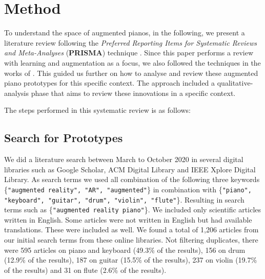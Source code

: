 \documentclass[sigchi, review]{acmart}
\begin{document}

\section{Method}
To understand the space of augmented pianos, in the following, we present a literature review following the \textit{Preferred Reporting Items for Systematic Reviews and Meta-Analyses} (\textbf{PRISMA}) technique \cite{moher2009preferred}. Since this paper performs a review with learning and augmentation as a focus, we also followed the techniques in the works of \cite{santos2013augmented, schneegass2016mobile, kljun2015transference, blattgerste2019augmented, mcpherson2015buttons, delgado2011state}. This guided us further on how to analyse and review these augmented piano prototypes for this specific context. The approach included a  qualitative-analysis phase that aims to review these innovations in a specific context. 



The steps performed in this systematic review is as follows: 

\subsection{Search for Prototypes}
We did a literature search between March to October 2020 in several digital libraries such as Google Scholar, ACM Digital Library and IEEE Xplore Digital Library. As search terms we used all combination of the following three keywords \{\texttt{"augmented reality", "AR", "augmented"}\} in combination with \{\texttt{"piano", "keyboard", "guitar", "drum", "violin", "flute"}\}. Resulting in search terms such as \{\texttt{"augmented reality piano"}\}.
We included only scientific articles written in English. Some articles were not written in English but had available translations. These were included as well. We found a total of 1,206 articles from our initial search terms from these online libraries. Not filtering duplicates, there were 595 articles on piano and keyboard (49.3\% of the results), 156 on drum (12.9\% of the results), 187 on guitar (15.5\% of the results), 237 on violin (19.7\% of the results) and 31 on flute (2.6\% of the results). 
\end{document}
